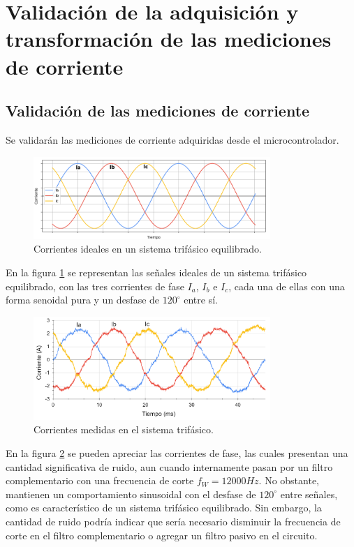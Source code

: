 \documentclass[11pt]{report}
\begin{document}
\section{Validación de la adquisición y transformación de las mediciones de corriente}

\subsection{Validación de las mediciones de corriente}
Se validarán las mediciones de corriente adquiridas desde el microcontrolador.

\begin{figure}[ht]
	\centering
	\includegraphics[width=0.8\textwidth]{imagenes/graficas/Corrientes_ABC_ideal.png}
	\caption{Corrientes ideales en un sistema trifásico equilibrado.}
	\label{corrientes_ABC_ideal}
\end{figure}
\FloatBarrier

En la figura \ref{corrientes_ABC_ideal} se representan las señales ideales de un sistema trifásico equilibrado, con las tres corrientes de fase $I_a$, $I_b$ e $I_c$, cada una de ellas con una forma senoidal pura y un desfase de $120^\circ$ entre sí.

\begin{figure}[ht]
	\centering
	\includegraphics[width=0.8\textwidth]{imagenes/graficas/Corrientes_ABC.png}
	\caption{Corrientes medidas en el sistema trifásico.}
	\label{corrientes_ABC}
\end{figure}
\FloatBarrier

En la figura \ref{corrientes_ABC} se pueden apreciar las corrientes de fase, las cuales presentan una cantidad significativa de ruido, aun cuando internamente pasan por un filtro complementario con una frecuencia de corte $f_W=12000Hz$. No obstante, mantienen un comportamiento sinusoidal con el desfase de $120^\circ$ entre señales, como es característico de un sistema trifásico equilibrado. Sin embargo, la cantidad de ruido podría indicar que sería necesario disminuir la frecuencia de corte en el filtro complementario o agregar un filtro pasivo en el circuito.
\end{document}

